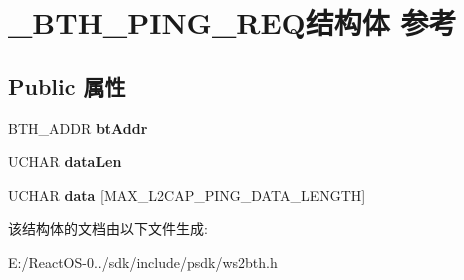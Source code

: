 \hypertarget{struct___b_t_h___p_i_n_g___r_e_q}{}\section{\+\_\+\+B\+T\+H\+\_\+\+P\+I\+N\+G\+\_\+\+R\+E\+Q结构体 参考}
\label{struct___b_t_h___p_i_n_g___r_e_q}
\subsection*{Public 属性}
\begin{DoxyCompactItemize}
\item 
\mbox{\label{struct___b_t_h___p_i_n_g___r_e_q_abcf08096075145f5e61ecb66a6fc724c}} 
B\+T\+H\+\_\+\+A\+D\+DR {\bfseries bt\+Addr}
\item 
\mbox{\label{struct___b_t_h___p_i_n_g___r_e_q_af87b8d99df25289e2032c1fe6e54011d}} 
U\+C\+H\+AR {\bfseries data\+Len}
\item 
\mbox{\label{struct___b_t_h___p_i_n_g___r_e_q_af85f464401016e6fdb926c45b370dc62}} 
U\+C\+H\+AR {\bfseries data} \mbox{[}M\+A\+X\+\_\+\+L2\+C\+A\+P\+\_\+\+P\+I\+N\+G\+\_\+\+D\+A\+T\+A\+\_\+\+L\+E\+N\+G\+TH\mbox{]}
\end{DoxyCompactItemize}


该结构体的文档由以下文件生成\+:\begin{DoxyCompactItemize}
\item 
E\+:/\+React\+O\+S-\/0../sdk/include/psdk/ws2bth.\+h\end{DoxyCompactItemize}
